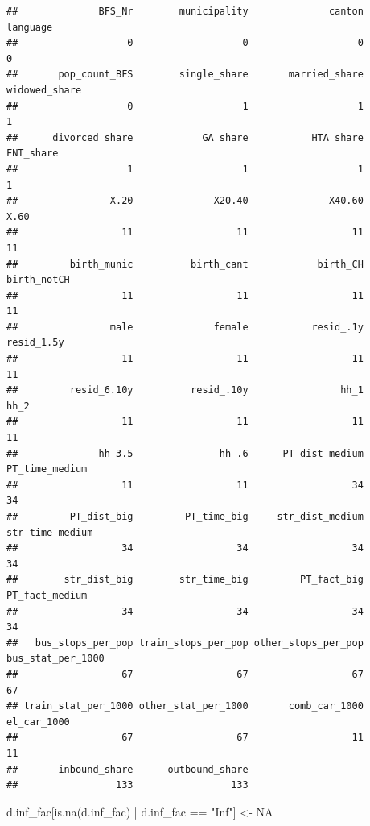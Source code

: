 \documentclass[
]{article}
\newenvironment{Shaded}{\begin{snugshade}}{\end{snugshade}}
\newcommand{\ConstantTok}[1]{\textcolor[rgb]{0.00,0.00,0.00}{#1}}
\newcommand{\FunctionTok}[1]{\textcolor[rgb]{0.00,0.00,0.00}{#1}}
\newcommand{\NormalTok}[1]{#1}
\newcommand{\OtherTok}[1]{\textcolor[rgb]{0.56,0.35,0.01}{#1}}
\newcommand{\SpecialCharTok}[1]{\textcolor[rgb]{0.00,0.00,0.00}{#1}}
\newcommand{\StringTok}[1]{\textcolor[rgb]{0.31,0.60,0.02}{#1}}
\begin{document}
\begin{verbatim}
##              BFS_Nr        municipality              canton            language 
##                   0                   0                   0                   0 
##       pop_count_BFS        single_share       married_share       widowed_share 
##                   0                   1                   1                   1 
##      divorced_share            GA_share           HTA_share           FNT_share 
##                   1                   1                   1                   1 
##                X.20              X20.40              X40.60                X.60 
##                  11                  11                  11                  11 
##         birth_munic          birth_cant            birth_CH         birth_notCH 
##                  11                  11                  11                  11 
##                male              female           resid_.1y          resid_1.5y 
##                  11                  11                  11                  11 
##         resid_6.10y          resid_.10y                hh_1                hh_2 
##                  11                  11                  11                  11 
##              hh_3.5               hh_.6      PT_dist_medium      PT_time_medium 
##                  11                  11                  34                  34 
##         PT_dist_big         PT_time_big     str_dist_medium     str_time_medium 
##                  34                  34                  34                  34 
##        str_dist_big        str_time_big         PT_fact_big      PT_fact_medium 
##                  34                  34                  34                  34 
##   bus_stops_per_pop train_stops_per_pop other_stops_per_pop   bus_stat_per_1000 
##                  67                  67                  67                  67 
## train_stat_per_1000 other_stat_per_1000       comb_car_1000         el_car_1000 
##                  67                  67                  11                  11 
##       inbound_share      outbound_share 
##                 133                 133
\end{verbatim}

\begin{Shaded}
\begin{Highlighting}[]
\NormalTok{d.inf\_fac[}\FunctionTok{is.na}\NormalTok{(d.inf\_fac) }\SpecialCharTok{|}\NormalTok{ d.inf\_fac }\SpecialCharTok{==} \StringTok{"Inf"}\NormalTok{] }\OtherTok{\textless{}{-}} \ConstantTok{NA}
\end{Highlighting}
\end{Shaded}
\end{document}
